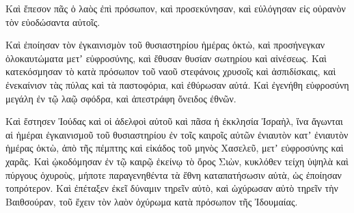 {Καὶ ἔπεσον πᾶς ὁ λαὸς ἐπὶ πρόσωπον, καὶ προσεκύνησαν, καὶ εὐλόγησαν εἰς οὐρανὸν τὸν εὐοδώσαντα αὐτοῖς.
\par }{\PP {}Καὶ ἐποίησαν τὸν ἐγκαινισμὸν τοῦ θυσιαστηρίου ἡμέρας ὀκτὼ, καὶ προσήνεγκαν ὁλοκαυτώματα μετʼ εὐφροσύνης, καὶ ἔθυσαν θυσίαν σωτηρίου καὶ αἰνέσεως.
Καὶ κατεκόσμησαν τὸ κατὰ πρόσωπον τοῦ ναοῦ στεφάνοις χρυσοῖς καὶ ἀσπιδίσκαις, καὶ ἐνεκαίνισν τὰς πύλας καὶ τὰ παστοφόρια, καὶ ἐθύρωσαν αὐτά.
Καὶ ἐγενήθη εὐφροσύνη μεγάλη ἐν τῷ λαῷ σφόδρα, καὶ ἀπεστράφη ὄνειδος ἐθνῶν.
\par }{\PP {}Καὶ ἔστησεν Ἰούδας καὶ οἱ ἀδελφοὶ αὐτοῦ καὶ πᾶσα ἡ ἐκκλησία Ἰσραὴλ, ἵνα ἄγωνται αἱ ἡμέραι ἐγκαινισμοῦ τοῦ θυσιαστηρίου ἐν τοῖς καιροῖς αὐτῶν ἐνιαυτὸν κατʼ ἐνιαυτὸν ἡμέρας ὀκτὼ, ἀπὸ τῆς πέμπτης καὶ εἰκάδος τοῦ μηνὸς Χασελεῦ, μετʼ εὐφροσύνης καὶ χαρᾶς.
Καὶ ᾠκοδόμησαν ἐν τῷ καιρῷ ἐκείνῳ τὸ ὄρος Σιὼν, κυκλόθεν τείχη ὑψηλὰ καὶ πύργους ὀχυροὺς, μήποτε παραγενηθέντα τὰ ἔθνη καταπατήσωσιν αὐτὰ, ὡς ἐποίησαν τοπρότερον.
Καὶ ἐπέταξεν ἐκεῖ δύναμιν τηρεῖν αὐτὸ, καὶ ὠχύρωσαν αὐτὸ τηρεῖν τὴν Βαιθσούραν, τοῦ ἔχειν τὸν λαὸν ὀχύρωμα κατὰ πρόσωπον τῆς Ἰδουμαίας.

}

